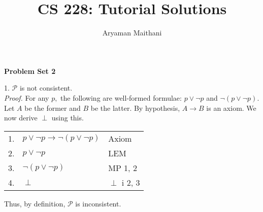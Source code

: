 \documentclass{article}
\title{CS 228: Tutorial Solutions}
\author{Aryaman Maithani}
\date{}
\begin{document}
\maketitle
\begin{center}
\textbf{Problem Set 2}
\end{center}
1. $\mathcal{P}$ is not consistent. \\
\emph{Proof.} For any $p,$ the following are well-formed formulae: $p \vee \neg p$ and $\neg(p \vee\neg p).$ Let $A$ be the former and $B$ be the latter. By hypothesis, $A \to B$ is an axiom. We now derive $\perp$ using this.
\begin{center}
	\begin{tabular}{l l l}
	1. & $p \vee \neg p \to \neg(p \vee \neg p)$ & Axiom\\
	2. & $p \vee \neg p$ & LEM\\
	3. & $\neg(p \vee \neg p)$ & MP 1, 2\\
	4. & $\perp$ & $\perp$ i 2, 3
	\end{tabular}
\end{center}
Thus, by definition, $\mathcal{P}$ is inconsistent.

\hrulefill
\end{document}
